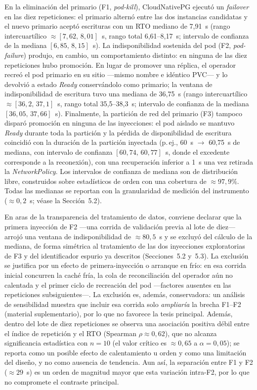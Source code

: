 \documentclass[12pt,twocolumn,letterpaper]{article}
\begin{document}
En la eliminación del primario (F1, \textit{pod-kill}), CloudNativePG ejecutó un \textit{failover} en las diez repeticiones: el primario alternó entre las dos instancias candidatas y el nuevo primario aceptó escrituras con un RTO mediano de 7,91~s (rango intercuartílico $\approx[7{,}62,\,8{,}01]$~s, rango total 6,61--8,17~s; intervalo de confianza de la mediana $[6{,}85,\,8{,}15]$~s). La indisponibilidad sostenida del pod (F2, \textit{pod-failure}) produjo, en cambio, un comportamiento distinto: en ninguna de las diez repeticiones hubo promoción. En lugar de promover una réplica, el operador recreó el pod primario en su sitio —mismo nombre e idéntico PVC— y lo devolvió a estado \textit{Ready} conservándolo como primario; la ventana de indisponibilidad de escritura tuvo una mediana de 36,75~s (rango intercuartílico $\approx[36{,}2,\,37{,}1]$~s, rango total 35,5--38,3~s; intervalo de confianza de la mediana $[36{,}05,\,37{,}66]$~s). Finalmente, la partición de red del primario (F3) tampoco disparó promoción en ninguna de las inyecciones: el pod aislado se mantuvo \textit{Ready} durante toda la partición y la pérdida de disponibilidad de escritura coincidió con la duración de la partición inyectada (p.\,ej., 60~s $\rightarrow$ 60,75~s de mediana, con intervalo de confianza $[60{,}74,\,60{,}77]$~s, donde el excedente corresponde a la reconexión), con una recuperación inferior a 1~s una vez retirada la \textit{NetworkPolicy}. Los intervalos de confianza de mediana son de distribución libre, construidos sobre estadísticos de orden con una cobertura de $\approx 97{,}9\%$. Todas las medianas se reportan con la granularidad de medición del instrumento ($\approx 0{,}2$~s; véase la Sección~5.2).

En aras de la transparencia del tratamiento de datos, conviene declarar que la primera inyección de F2 —una corrida de validación previa al lote de diez— arrojó una ventana de indisponibilidad de $\approx 80{,}5$~s y se excluyó del cálculo de la mediana, de forma simétrica al tratamiento de las dos inyecciones exploratorias de F3 y del identificador espurio ya descritos (Secciones~5.2 y~5.3). La exclusión se justifica por un efecto de primera-inyección o arranque en frío: en esa corrida inicial concurren la caché fría, la cola de reconciliación del operador aún no calentada y el primer ciclo de recreación del pod —factores ausentes en las repeticiones subsiguientes—. La exclusión es, además, conservadora: un análisis de sensibilidad muestra que incluir esa corrida solo \emph{ampliaría} la brecha F1--F2 (material suplementario), por lo que no favorece la tesis principal. Además, dentro del lote de diez repeticiones se observa una asociación positiva débil entre el índice de repetición y el RTO (Spearman $\rho\approx 0{,}62$), que no alcanza significancia estadística con $n=10$ (el valor crítico es $\approx 0{,}65$ a $\alpha=0{,}05$); se reporta como un posible efecto de calentamiento u orden y como una limitación del diseño, y no como ausencia de tendencia. Aun así, la separación entre F1 y F2 ($\approx 29$~s) es un orden de magnitud mayor que esta variación intra-F2, por lo que no compromete el contraste principal.
\end{document}
